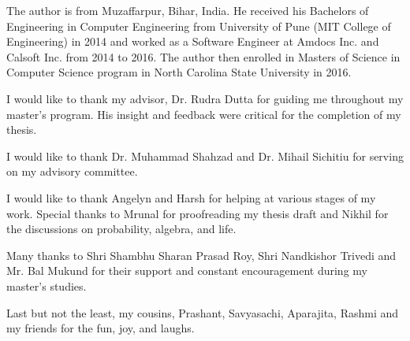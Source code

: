 \begin{biography}
The author is from Muzaffarpur, Bihar, India. He received his Bachelors of Engineering in Computer Engineering from University of Pune (MIT College of Engineering) in 2014 and worked as a Software Engineer at Amdocs Inc. and Calsoft Inc. from 2014 to 2016. The author then enrolled in Masters of Science in Computer Science program in North Carolina State University in 2016.
\end{biography}

\begin{acknowledgements}
I would like to thank my advisor, Dr. Rudra Dutta for guiding me throughout my master's program. His insight and feedback were critical for the completion of my thesis.

I would like to thank Dr. Muhammad Shahzad and Dr. Mihail Sichitiu for serving on my advisory committee. 

I would like to thank Angelyn and Harsh for helping at various stages of my work. Special thanks to Mrunal for proofreading my thesis draft and Nikhil for the discussions on probability, algebra, and life.

Many thanks to Shri Shambhu Sharan Prasad Roy, Shri Nandkishor Trivedi and Mr. Bal Mukund for their support and constant encouragement during my master's studies.

Last but not the least, my cousins, Prashant, Savyasachi, Aparajita, Rashmi and my friends for the fun, joy, and laughs.

\end{acknowledgements}


\thesistableofcontents

\thesislistoftables

\thesislistoffigures
